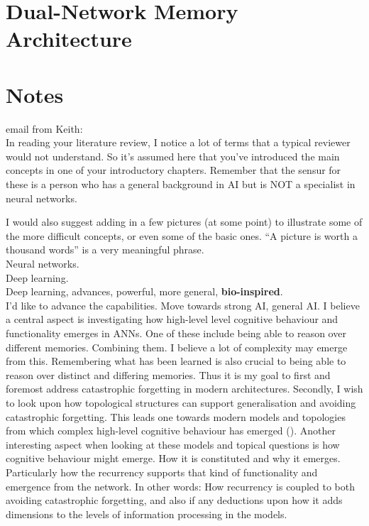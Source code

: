 \section{Dual-Network Memory Architecture}


\section{Notes}
email from Keith:
\\
  In reading your literature review, I notice a lot of terms that a typical reviewer would not understand.  So it’s assumed here that you’ve introduced the main concepts in one of your introductory chapters.  Remember that the
sensur for these is a person who has a general background in AI but is  NOT a specialist in neural networks.

  I would also suggest adding in a few pictures (at some point) to illustrate some of the more difficult concepts, or even some of the basic ones.  “A picture is worth a thousand words” is a very meaningful phrase.
\\
Neural networks.
\\
Deep learning.
\\
Deep learning, advances, powerful, more general, \textbf{bio-inspired}.
\\
I'd like to advance the capabilities. Move towards strong AI, general AI.
I believe a central aspect is investigating how high-level level cognitive behaviour and functionality emerges in ANNs.
One of these include being able to reason over different memories. Combining them. I believe a lot of complexity may emerge from this.
Remembering what has been learned is also crucial to being able to reason over distinct and differing memories.
Thus it is my goal to first and foremost address catastrophic forgetting in modern architectures.
Secondly, I wish to look upon how topological structures can support generalisation and avoiding catastrophic forgetting.
This leads one towards modern models and topologies from which complex high-level cognitive behaviour has emerged (\cite{Tani2014}).
Another interesting aspect when looking at these models and topical questions is how cognitive behaviour might emerge. How it is constituted and why it emerges. Particularly how the recurrency supports that kind of functionality and emergence from the network. In other words: How recurrency is coupled to both avoiding catastrophic forgetting, and also if any deductions upon how it adds dimensions to the levels of information processing in the models.
\\
